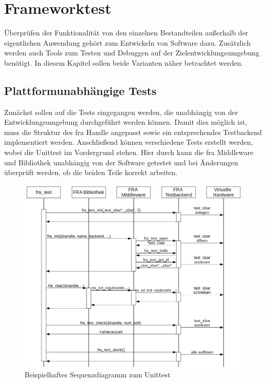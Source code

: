 \chapter{Frameworktest} \label{sec:test}
Überprüfen der Funktionalität von den einzelnen Bestandteilen außerhalb der eigentlichen Anwendung gehört zum Entwickeln von Software dazu. %
Zusätzlich werden auch Tools zum Testen und Debuggen auf der Zielentwicklungsumgebung benötigt. 
In diesem Kapitel sollen beide Varianten näher betrachtet werden.

\section{Plattformunabhängige Tests}
Zunächst sollen auf die Tests eingegangen werden, die unabhängig von der Entwicklungsumgebung durchgeführt werden können. 
Damit dies möglich ist, muss die Struktur des \ac{fra} Handle angepasst sowie ein entsprechendes Testbackend implementiert werden. Anschließend können verschiedene Tests erstellt werden, wobei die Unittest im Vordergrund stehen. Hier durch kann die \ac{fra} Middleware und Bibliothek unabhängig von der Software getestet und bei Änderungen überprüft werden, ob die beiden Teile korrekt arbeiten.

\begin{figure}[!hbtp]
	\centering
	\includegraphics[width = \linewidth]{pictures/2019-11-28-testbackend.png}
	\smallskip
	\caption{Beispielhaftes Sequenzdiagramm zum Unittest}
	\label{fig:testbackend}
\end{figure} 


